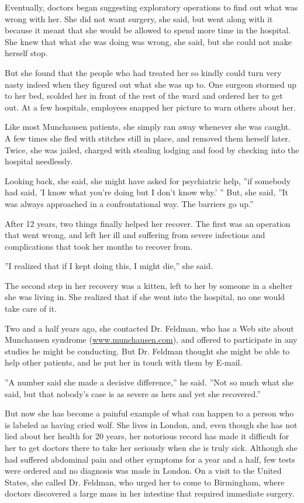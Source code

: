 Eventually, doctors began suggesting exploratory operations to find out
what was wrong with her. She did not want surgery, she said, but went
along with it because it meant that she would be allowed to spend more
time in the hospital. She knew that what she was doing was wrong, she
said, but she could not make herself stop.

But she found that the people who had treated her so kindly could turn
very nasty indeed when they figured out what she was up to. One surgeon
stormed up to her bed, scolded her in front of the rest of the ward and
ordered her to get out. At a few hospitals, employees snapped her
picture to warn others about her.

Like most Munchausen patients, she simply ran away whenever she was
caught. A few times she fled with stitches still in place, and removed
them herself later. Twice, she was jailed, charged with stealing lodging
and food by checking into the hospital needlessly.

Looking back, she said, she might have asked for psychiatric help, ''if
somebody had said, 'I know what you're doing but I don't know why.' ''
But, she said, ''It was always approached in a confrontational way. The
barriers go up.''

After 12 years, two things finally helped her recover. The first was an
operation that went wrong, and left her ill and suffering from severe
infections and complications that took her months to recover from.

''I realized that if I kept doing this, I might die,'' she said.

The second step in her recovery was a kitten, left to her by someone in
a shelter she was living in. She realized that if she went into the
hospital, no one would take care of it.

Two and a half years ago, she contacted Dr. Feldman, who has a Web site
about Munchausen syndrome
(\href{http://www.munchausen.com}{www.munchausen.com}), and offered to
participate in any studies he might be conducting. But Dr. Feldman
thought she might be able to help other patients, and he put her in
touch with them by E-mail.

''A number said she made a decisive difference,'' he said. ''Not so much
what she said, but that nobody's case is as severe as hers and yet she
recovered.''

But now she has become a painful example of what can happen to a person
who is labeled as having cried wolf. She lives in London, and, even
though she has not lied about her health for 20 years, her notorious
record has made it difficult for her to get doctors there to take her
seriously when she is truly sick. Although she had suffered abdominal
pain and other symptoms for a year and a half, few tests were ordered
and no diagnosis was made in London. On a visit to the United States,
she called Dr. Feldman, who urged her to come to Birmingham, where
doctors discovered a large mass in her intestine that required immediate
surgery.

